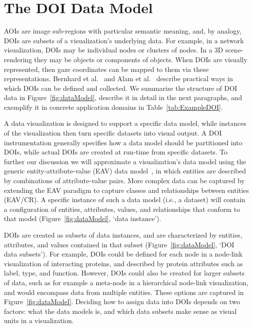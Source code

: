 \section{The DOI Data Model}
\label{sec:DataModel}
AOIs are image sub-regions with particular semantic meaning, and, by analogy, DOIs are subsets of a visualization's underlying data. For example, in a network visualization, DOIs may be individual nodes or clusters of nodes. In a 3D scene-rendering they may be objects or components of objects. When DOIs are visually represented, then gaze coordinates can be mapped to them via these representations. Bernhard et al.~\cite{bernhard2014gaze} and Alam et al.~\cite{alam15analyzing} describe practical ways in which DOIs can be defined and collected. We summarize the structure of DOI data in Figure~\ref{fig:dataModel}, describe it in detail in the next paragraphs, and exemplify it in concrete application domains in Table~\ref{tab:ExampleDOI}. 

A data visualization is designed to support a specific data model, while instances of the visualization then turn specific datasets into visual output. A DOI instrumentation generally specifies how a data model should be partitioned into DOIs, while actual DOIs are created at run-time from specific datasets. To further our discussion we will approximate a visualization's data model using the generic entity-attribute-value (EAV) data model~\cite{deran1991entity}, in which entities are described by combinations of attribute-value pairs. More complex data can be captured by extending the EAV paradigm to capture classes and relationships between entities (EAV/CR).  A specific instance of such a data model (i.e., a dataset) will contain a configuration of entities, attributes, values, and relationships that conform to that model (Figure~\ref{fig:dataModel}, `data instance'). 

DOIs are created as subsets of data instances, and are characterized by entities, attributes, and values contained in that subset (Figure~\ref{fig:dataModel}, `DOI data subsets'). For example, DOIs could be defined for each node in a node-link visualization of interacting proteins, and described by protein attributes such as label, type, and function. However, DOIs could also be created for larger subsets of data, such as for example a meta-node in a hierarchical node-link visualization, and would encompass data from multiple entities. These options are captured in Figure~\ref{fig:dataModel}. Deciding how to assign data into DOIs depends on two factors: what the data models is, and which data subsets make sense as visual units in a visualization. 

